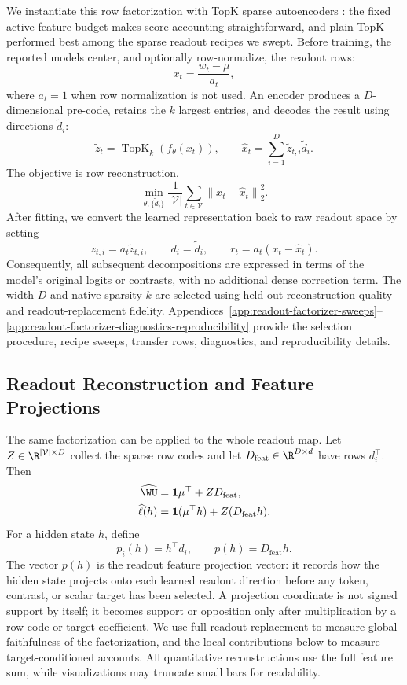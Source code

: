 We instantiate this row factorization with TopK sparse autoencoders
\citep{makhzani2013ksparse,gao2024scaling}: the fixed active-feature budget
makes score accounting straightforward, and plain TopK performed best among the
sparse readout recipes we swept. Before training, the reported models center,
and optionally row-normalize, the readout rows:
\[
    x_t = \frac{w_t-\mu}{a_t},
\]
where \(a_t=1\) when row normalization is not used. An encoder produces a
\(D\)-dimensional pre-code, retains the \(k\) largest entries, and decodes the
result using directions \(\widetilde d_i\):
\[
    \widetilde z_t
    =
    \operatorname{TopK}_k(f_\theta(x_t)),
    \qquad
    \widehat{x}_t
    =
    \sum_{i=1}^{D}\widetilde z_{t,i}\widetilde d_i .
\]
The objective is row reconstruction,
\[
    \min_{\theta,\{\widetilde d_i\}}
    \frac{1}{|\mathcal{V}|}
    \sum_{t\in\mathcal{V}}
    \left\|x_t-\widehat{x}_t\right\|_2^2 .
\]
After fitting, we convert the learned representation back to raw readout
space by setting
\[
    z_{t,i}=a_t\widetilde z_{t,i},
    \qquad
    d_i=\widetilde d_i,
    \qquad
    r_t=a_t(x_t-\widehat{x}_t).
\]
Consequently, all subsequent decompositions are expressed in terms of the
model's original logits or contrasts, with no additional dense correction term.
The width \(D\) and native sparsity \(k\) are selected using held-out
reconstruction quality and readout-replacement fidelity.
Appendices~\ref{app:readout-factorizer-sweeps}--%
\ref{app:readout-factorizer-diagnostics-reproducibility} provide the selection
procedure, recipe sweeps, transfer rows, diagnostics, and reproducibility
details.

\subsection{Readout Reconstruction and Feature Projections}
\label{sec:method-feature-projections}

The same factorization can be applied to the whole readout map. Let \(Z\in
\R^{|\mathcal{V}|\times D}\) collect the sparse row codes and let
\(D_{\mathrm{feat}}\in\R^{D\times d}\) have rows \(d_i^\top\). Then
\[
    \begin{aligned}
    \widehat{\WU}
    &=
    \mathbf{1}\mu^\top
    +
    ZD_{\mathrm{feat}},\\
    \widehat{\ell}(h)
    &=
    \mathbf{1}(\mu^\top h)
    +
    Z(D_{\mathrm{feat}}h).
    \end{aligned}
\]
For a hidden state \(h\), define
\[
    p_i(h)=h^\top d_i,
    \qquad
    p(h)=D_{\mathrm{feat}}h .
\]
The vector \(p(h)\) is the readout feature projection vector: it records how the
hidden state projects onto each learned readout direction before any token,
contrast, or scalar target has been selected. A projection coordinate is not
signed support by itself; it becomes support or opposition only after
multiplication by a row code or target coefficient. We use full readout
replacement to measure global faithfulness of the factorization, and the local
contributions below to measure target-conditioned accounts. All quantitative
reconstructions use the full feature sum, while visualizations may truncate
small bars for readability.

